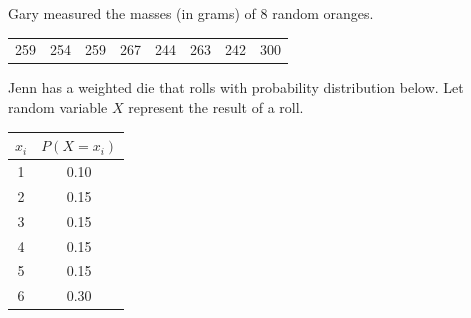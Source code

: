 \documentclass[12pt,letterpaper,addpoints]{exam}
\begin{document}
\begin{questions}

\newpage

\question[10] Gary measured the masses (in grams) of 8 random oranges.
\begin{center}
\begin{tabular}{c c c c c c c c}
259 & 254 & 259 & 267 & 244 & 263 & 242 & 300
\end{tabular}
\end{center}

\newpage

\question[10] Jenn has a weighted die that rolls with probability distribution below. Let random variable $X$ represent the result of a roll.
\vspace{10pt}

{\large
\begin{tabular}{|c|c|}\hline 
$x_i$ & $P(X=x_i)$ \\ \hline
1 & 0.10\\
2 & 0.15\\
3 & 0.15\\
4 & 0.15\\
5 & 0.15\\
6 & 0.30\\\hline
\end{tabular}
}

\vspace{10pt}
\begin{parts}

\end{parts}
\end{questions}
\end{document}
